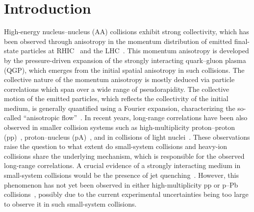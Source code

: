 
\section{Introduction}
\label{sec:intro}

High-energy nucleus--nucleus (AA) collisions exhibit strong collectivity, which has been observed through anisotropy in the momentum distribution of emitted final-state particles at RHIC~\cite{Adams:2005dq,Adcox:2004mh,Arsene:2004fa,Back:2004je} and the LHC~\cite{Abelev:2012di, Abelev:2014pua, ATLAS:2011ah,ALICE:2022wpn}. This momentum anisotropy is developed by the pressure-driven expansion of the strongly interacting quark--gluon plasma (QGP), which emerges from the initial spatial anisotropy in such collisions.
The collective nature of the momentum anisotropy is mostly deduced via particle correlations which span over a wide range of pseudorapidity. The collective motion of the emitted particles, which reflects the collectivity of the initial medium, is generally quantified using a Fourier expansion, characterizing the so-called ``anisotropic flow''~\cite{Ollitrault:1992bk}. In recent years, long-range correlations have been also observed in smaller collision systems such as high-multiplicity proton--proton (pp)~\cite{ATLAS:2015hzw,Khachatryan:2015lva,Khachatryan:2016txc,Acharya:2019vdf,ATLAS:2017rtr}, proton--nucleus (pA)~\cite{ALICE:2012eyl,ATLAS:2014qaj,ATLAS:2016yzd,Khachatryan:2016ibd}, and in collisions of light nuclei~\cite{PHENIX:2018lia,Aidala:2017ajz}. 
These observations raise the question to what extent do small-system collisions and heavy-ion collisions share the underlying mechanism, which is responsible for the observed long-range correlations.
A crucial evidence of a strongly interacting medium in small-system collisions would be the presence of jet quenching~\cite{Gyulassy:1990ye,Wang:1991xy}. However, this phenomenon has not yet been observed in either high-multiplicity pp or p--Pb collisions~\cite{Adam:2014qja,Khachatryan:2016odn,Adam:2016jfp,Adam:2016dau,Acharya:2017okq}, possibly due to the current experimental uncertainties being too large to observe it in such small-system collisions.

